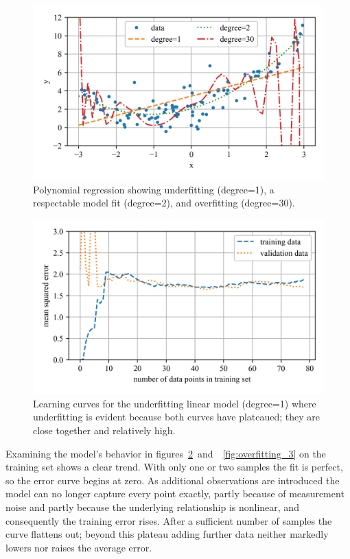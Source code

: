 \documentclass[12pt,letter]{article}
\begin{document}
\begin{figure}[h]
\centering
\includegraphics[]{../figures/overfitting_1.png}
\caption{Polynomial regression showing underfitting (degree=1), a respectable model fit (degree=2), and overfitting (degree=30).}
\label{fig:overfitting_1}
\end{figure}





\begin{figure}[H]
\centering
\includegraphics[]{../figures/overfitting_2.png}
\caption{Learning curves for the underfitting linear model (degree=1) where underfitting is evident because both curves have plateaued; they are close together and relatively high.}
\label{fig:overfitting_2}
\end{figure}

Examining the model's behavior in figures~\ref{fig:overfitting_2}~and~~\ref{fig:overfitting_3} on the training set shows a clear trend. With only one or two samples the fit is perfect, so the error curve begins at zero. As additional observations are introduced the model can no longer capture every point exactly, partly because of measurement noise and partly because the underlying relationship is nonlinear, and consequently the training error rises. After a sufficient number of samples the curve flattens out; beyond this plateau adding further data neither markedly lowers nor raises the average error.
\end{document}

